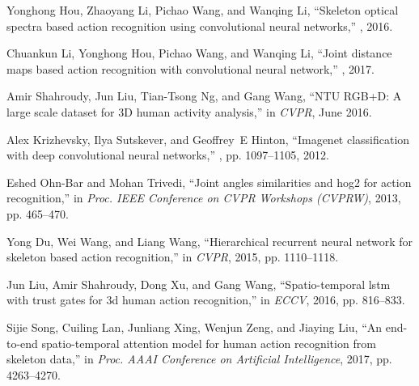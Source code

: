 \documentclass[5pt]{article}
\begin{document}
\begin{thebibliography}{10}
Yonghong Hou, Zhaoyang Li, Pichao Wang, and Wanqing Li,
\newblock ``Skeleton optical spectra based action recognition using
  convolutional neural networks,''
,
  2016.

Chuankun Li, Yonghong Hou, Pichao Wang, and Wanqing Li,
\newblock ``Joint distance maps based action recognition with convolutional
  neural network,''
, 2017.

Amir Shahroudy, Jun Liu, Tian-Tsong Ng, and Gang Wang,
\newblock ``{NTU RGB+D}: A large scale dataset for {3D} human activity
  analysis,''
\newblock in {\em CVPR}, June 2016.

Alex Krizhevsky, Ilya Sutskever, and Geoffrey~E Hinton,
\newblock ``Imagenet classification with deep convolutional neural networks,''
, pp.
  1097--1105, 2012.

Eshed Ohn-Bar and Mohan Trivedi,
\newblock ``Joint angles similarities and hog2 for action recognition,''
\newblock in {\em Proc. IEEE Conference on CVPR Workshops (CVPRW)}, 2013, pp.
  465--470.

Yong Du, Wei Wang, and Liang Wang,
\newblock ``Hierarchical recurrent neural network for skeleton based action
  recognition,''
\newblock in {\em CVPR}, 2015, pp. 1110--1118.

Jun Liu, Amir Shahroudy, Dong Xu, and Gang Wang,
\newblock ``Spatio-temporal lstm with trust gates for 3d human action
  recognition,''
\newblock in {\em ECCV}, 2016, pp. 816--833.

Sijie Song, Cuiling Lan, Junliang Xing, Wenjun Zeng, and Jiaying Liu,
\newblock ``An end-to-end spatio-temporal attention model for human action
  recognition from skeleton data,''
\newblock in {\em Proc. AAAI Conference on Artificial Intelligence}, 2017, pp.
  4263--4270.

\end{thebibliography}
	
\end{document}
